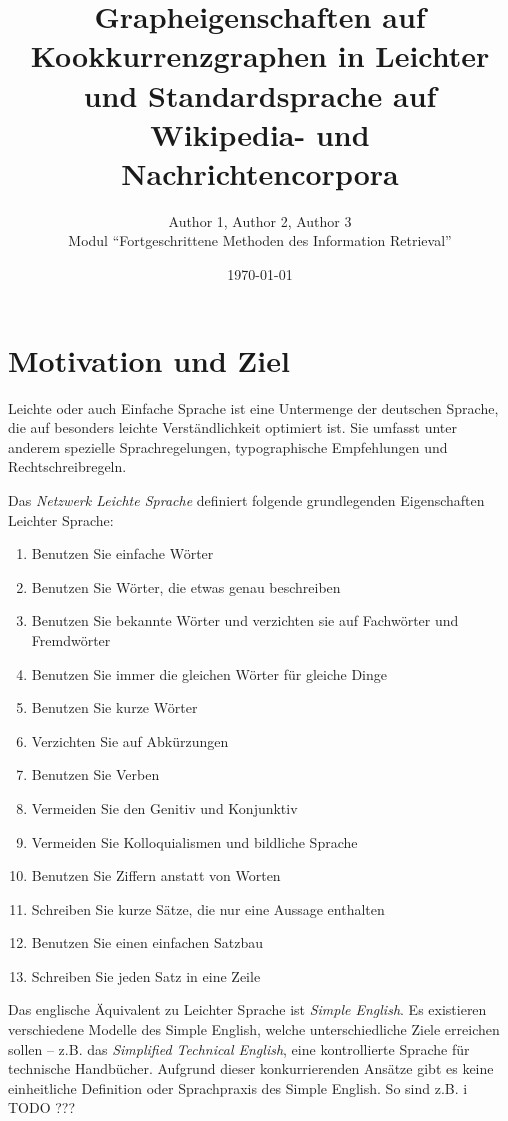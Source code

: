 \documentclass[11pt, a4paper]{article}
\title{Grapheigenschaften auf Kookkurrenzgraphen in Leichter und Standardsprache auf Wikipedia- und Nachrichtencorpora}
\author{Author 1, Author 2, Author 3\\Modul "`Fortgeschrittene Methoden des Information Retrieval"'}
\date{\today}
\begin{document}
\maketitle
\tableofcontents

\section{Motivation und Ziel}

Leichte oder auch Einfache Sprache ist eine Untermenge der deutschen Sprache,
die auf besonders leichte Verst\"andlichkeit optimiert ist. Sie umfasst unter
anderem spezielle Sprachregelungen, typographische Empfehlungen und
Rechtschreibregeln. 

Das \emph{Netzwerk Leichte Sprache} definiert folgende grundlegenden
Eigenschaften Leichter Sprache:

\begin{enumerate}
	\item Benutzen Sie einfache W\"orter
	\item Benutzen Sie W\"orter, die etwas genau beschreiben
	\item Benutzen Sie bekannte W\"orter und verzichten sie auf Fachw\"orter und Fremdw\"orter
	\item Benutzen Sie immer die gleichen W\"orter f\"ur gleiche Dinge
	\item Benutzen Sie kurze W\"orter
	\item Verzichten Sie auf Abk\"urzungen
	\item Benutzen Sie Verben
	\item Vermeiden Sie den Genitiv und Konjunktiv
	\item Vermeiden Sie Kolloquialismen und bildliche Sprache
	\item Benutzen Sie Ziffern anstatt von Worten
	\item Schreiben Sie kurze S\"atze, die nur eine Aussage enthalten
	\item Benutzen Sie einen einfachen Satzbau
	\item Schreiben Sie jeden Satz in eine Zeile
\end{enumerate}

Das englische \"Aquivalent zu Leichter Sprache ist \emph{Simple English}. Es
existieren verschiedene Modelle des Simple English, welche unterschiedliche
Ziele erreichen sollen -- z.B. das \emph{Simplified Technical English}, eine
kontrollierte Sprache f\"ur technische Handb\"ucher. Aufgrund dieser
konkurrierenden Ans\"atze gibt es keine einheitliche Definition oder
Sprachpraxis des Simple English. So sind z.B. i TODO ???
\end{document}
